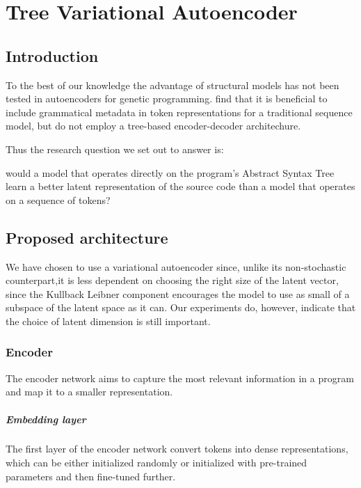 \chapter{Tree Variational Autoencoder}\label{ch:tree2tree}


\section{Introduction}

To the best of our knowledge the advantage of structural models has not been tested in autoencoders for genetic programming. \cite{kusner2017grammar,grammar-vae} find that it is beneficial to include grammatical metadata in token representations for a traditional sequence model, but do not employ a tree-based encoder-decoder architechure.

Thus the research question we set out to answer is: 

\begin{highlight}
    would a model that operates directly on the program's Abstract Syntax Tree learn a better latent representation of the source code than a model that operates on a sequence of tokens?
\end{highlight}

\newpage
\section{Proposed architecture}


We have chosen to use a variational autoencoder \cite{kingma2013auto} since, unlike its non-stochastic counterpart,it is less dependent on choosing the right size of the latent vector, since the Kullback Leibner component encourages the model to use as small of a subspace of the latent space as it can.
Our experiments do, however, indicate that the choice of latent dimension is still important.

\subsection{Encoder}
The encoder network aims to capture the most relevant information in a program and map it to a smaller representation. 



\paragraph{Embedding layer} The first layer of the encoder network convert tokens into dense representations, which can be either initialized randomly or initialized with pre-trained parameters and then fine-tuned further.



